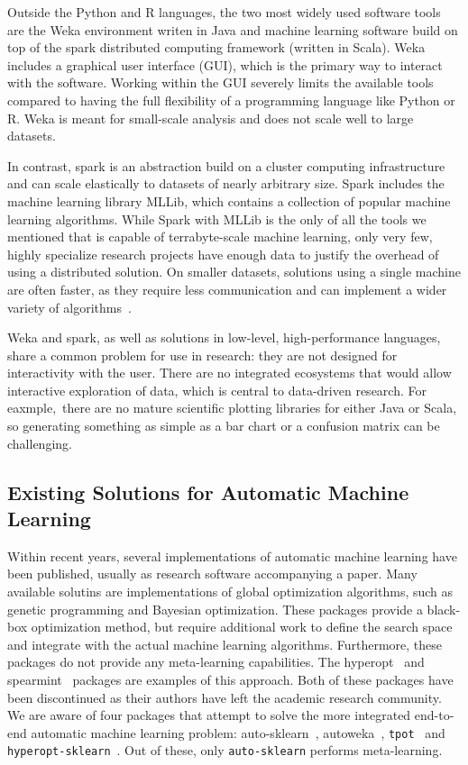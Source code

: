 Outside the Python and R languages, the two most widely used software tools are
the Weka environment writen in Java and machine learning software build on top
of the spark distributed computing framework (written in Scala).
Weka includes a graphical user interface (GUI), which is the primary way to interact with
the software.  Working within the GUI severely limits the available tools compared to
having the full flexibility of a programming language like Python or R.
Weka is meant for small-scale analysis and does not scale well to large datasets.

In contrast, spark is an abstraction build on a cluster computing
infrastructure and can scale elastically to datasets of nearly arbitrary size.
Spark includes the machine learning library MLLib, which contains a collection
of popular machine learning algorithms.
While Spark with MLLib is the only of all the tools we mentioned that is capable of
terrabyte-scale machine learning, only very few, highly specialize research projects have
enough data to justify the overhead of using a distributed solution. On smaller
datasets, solutions using a single machine are often faster, as they require less
communication and can implement a wider variety of algorithms~\autocite{rfbench}.

Weka and spark, as well as solutions in low-level, high-performance languages,
share a common problem for use in research: they are not designed for interactivity
with the user. There are no integrated ecosystems that would allow
interactive exploration of data, which is central to data-driven research.
For eaxmple, there are no mature scientific plotting libraries for either Java or Scala, so
generating something as simple as a bar chart or a confusion matrix can be
challenging.


\subsection{Existing Solutions for Automatic Machine Learning}
Within recent years, several implementations of automatic machine learning have
been published, usually as research software accompanying a paper. Many
available solutins are implementations of global optimization algorithms, such
as genetic programming and Bayesian optimization.
These packages provide a black-box optimization method, but require additional
work to define the search space and integrate with the actual machine learning
algorithms. Furthermore, these packages do not provide any meta-learning capabilities.
The hyperopt~\autocite{bergstra2013hyperopt} and
spearmint~\autocite{snoek2015scalable} packages are examples of this approach.
Both of these packages have been discontinued as their authors have left the academic
research community.
We are aware of four packages that attempt to solve the more integrated
end-to-end automatic machine learning problem:
auto-sklearn~\autocite{feurer-nips2015},
autoweka~\autocite{ThoHutHooLey13-AutoWEKA, kotthoff2016auto},
\texttt{tpot}~\autocite{Olson2016EvoBio, OlsonGECCO2016} and
\texttt{hyperopt-sklearn}~\autocite{komer2014hyperopt}. Out of these, only \texttt{auto-sklearn}
performs meta-learning.

